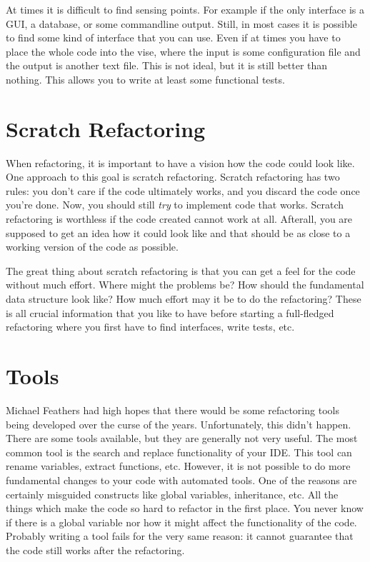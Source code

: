 At times it is difficult to find sensing points. For example if the only interface is a GUI, a database, or some commandline output. Still, in most cases it is possible to find some kind of interface that you can use. Even if at times you have to place the whole code into the vise, where the input is some configuration file and the output is another text file. This is not ideal, but it is still better than nothing. This allows you to write at least some functional tests.


\section{Scratch Refactoring}

When refactoring, it is important to have a vision how the code could look like. One approach to this goal is scratch refactoring. Scratch refactoring has two rules: you don't care if the code ultimately works, and you discard the code once you're done. Now, you should still \textit{try} to implement code that works. Scratch refactoring is worthless if the code created cannot work at all. Afterall, you are supposed to get an idea how it could look like and that should be as close to a working version of the code as possible.

The great thing about scratch refactoring is that you can get a feel for the code without much effort. Where might the problems be? How should the fundamental data structure look like? How much effort may it be to do the refactoring? These is all crucial information that you like to have before starting a full-fledged refactoring where you first have to find interfaces, write tests, etc.

\section{Tools}

Michael Feathers had high hopes that there would be some refactoring tools being developed over the curse of the years. Unfortunately, this didn't happen. There are some tools available, but they are generally not very useful. The most common tool is the search and replace functionality of your IDE. This tool can rename variables, extract functions, etc. However, it is not possible to do more fundamental changes to your code with automated tools. One of the reasons are certainly misguided constructs like global variables, inheritance, etc. All the things which make the code so hard to refactor in the first place. You never know if there is a global variable nor how it might affect the functionality of the code. Probably writing a tool fails for the very same reason: it cannot guarantee that the code still works after the refactoring.

